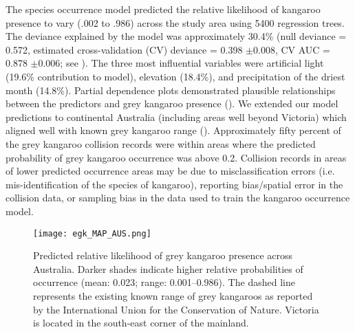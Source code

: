 The species occurrence model predicted the relative likelihood of kangaroo presence to vary (.002 to .986) across the study area using 5400 regression trees. The deviance explained by the model was approximately 30.4\% (null deviance = 0.572, estimated cross-validation (CV) deviance = 0.398 $\pm$0.008, CV AUC = 0.878 $\pm$0.006; see ). The three most influential variables were artificial light (19.6\% contribution to model), elevation (18.4\%), and precipitation of the driest month (14.8\%). Partial dependence plots demonstrated plausible relationships between the predictors and grey kangaroo presence (). We extended our model predictions to continental Australia (including areas well beyond Victoria) which aligned well with known grey kangaroo range (). Approximately fifty percent of the grey kangaroo collision records were within areas where the predicted probability of grey kangaroo occurrence was above 0.2. Collision records in areas of lower predicted occurrence areas may be due to misclassification errors (i.e. mis-identification of the species of kangaroo), reporting bias/spatial error in the collision data, or sampling bias in the data used to train the kangaroo occurrence model.

\begin{figure*}[htp]
  \centering
  \texttt{[image: egk\_MAP\_AUS.png]}
  \caption[Predicted relative likelihood of grey kangaroo presence across Australia]{Predicted relative likelihood of grey kangaroo presence across Australia. Darker shades indicate higher relative probabilities of occurrence (mean: 0.023; range: 0.001--0.986). The dashed line represents the existing known range of grey kangaroos as reported by the International Union for the Conservation of Nature. Victoria is located in the south-east corner of the mainland.}
  \label{egk_map_aus}
\end{figure*}

